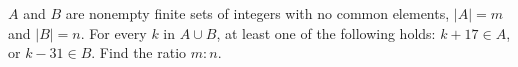 $A$ and $B$ are nonempty finite sets of integers with no common elements, $|A|=m$ and $|B|=n$. For every $k$ in $A\cup B$, at least one of the following holds: $k+17\in A$, or $k-31\in B$. Find the ratio $m:n$.

